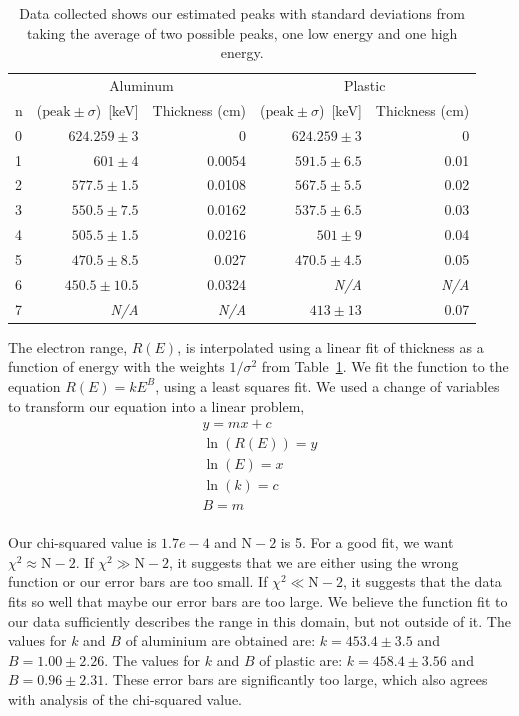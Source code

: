 \begin{table}
	[tbp] 
	\begin{center}
		\begin{tabular}{lrrrr}
\toprule
 	 &  		\multicolumn{2}{c}{Aluminum} 			 & 			\multicolumn{2}{c}{Plastic} 				\\
\cmidrule(r){2-3}
\cmidrule(r){4-5}
n    & ($\text{peak}\pm\sigma$)~[keV] 	& Thickness (cm) & ($\text{peak}\pm\sigma$)~[keV] 	& Thickness (cm) 	\\
\midrule
0    & $624.259\pm3$					&	0	         &	$624.259\pm3$					&	0   			\\
1    & $601\pm4$						&	0.0054		 &	$591.5\pm6.5$					&	0.01			\\
2    & $577.5\pm1.5$					&	0.0108		 &	$567.5\pm5.5$					&	0.02			\\
3    & $550.5\pm7.5$					&	0.0162		 &	$537.5\pm6.5$					&	0.03			\\
4    & $505.5\pm1.5$					&	0.0216		 &	$501\pm9$						&	0.04			\\
5    & $470.5\pm8.5$					&	0.027	     &	$470.5\pm4.5$					&	0.05			\\
6    & $450.5\pm10.5$					&	0.0324		 &	\textit{N/A}					&	\textit{N/A}	\\
7    & 	\textit{N/A}	    			&	\textit{N/A} &	$413\pm13$						&	0.07  			\\
\bottomrule
		\end{tabular}
	\end{center}
	\caption{Data collected shows our estimated peaks with standard deviations from taking the average of two possible peaks, one low energy and one high energy.} \label{tab:dataCollected}
\end{table}%
The electron range, $R(E)$, is interpolated using a linear fit of thickness as a function of energy with the weights $1/\sigma^2$ from Table~\ref{tab:dataCollected}. We fit the function to the equation $R(E)=kE^B$, using a least squares fit.  We used a change of variables to transform our equation into a linear problem,
\begin{align*}
	y = m x + c \\
\ln(R(E)) = y \\
\ln(E) = x \\
\ln(k) = c \\
B = m \\
\end{align*}

 Our chi-squared value is $1.7e-4$ and $\text{N}-2$ is 5.  For a good fit, we want $\chi^2\approx \text{N}-2$.  If $\chi^2 \gg \text{N}-2$, it suggests that we are either using the wrong function or our error bars are too small.  If $\chi^2 \ll \text{N}-2$, it suggests that the data fits so well that maybe our error bars are too large.\cite{garcia2000numerical}  We believe the function fit to our data sufficiently describes the range in this domain, but not outside of it.  The values for $k$ and $B$ of aluminium are obtained are: $k = 453.4 \pm 3.5$ and $B = 1.00 \pm 2.26$.  The values for $k$ and $B$ of plastic are: $k = 458.4 \pm 3.56$ and $B = 0.96 \pm 2.31$.  These error bars are significantly too large, which also agrees with analysis of the chi-squared value.

